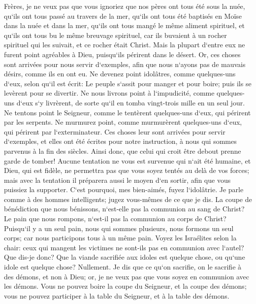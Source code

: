 \verse Frères, je ne veux pas que vous ignoriez que nos pères ont tous été sous la nuée, qu`ils ont tous passé au travers de la mer, 
\verse qu`ils ont tous été baptisés en Moïse dans la nuée et dans la mer, 
\verse qu`ils ont tous mangé le même aliment spirituel, 
\verse et qu`ils ont tous bu le même breuvage spirituel, car ils buvaient à un rocher spirituel qui les suivait, et ce rocher était Christ. 
\verse Mais la plupart d`entre eux ne furent point agréables à Dieu, puisqu`ils périrent dans le désert. 
\verse Or, ces choses sont arrivées pour nous servir d`exemples, afin que nous n`ayons pas de mauvais désirs, comme ils en ont eu. 
\verse Ne devenez point idolâtres, comme quelques-uns d`eux, selon qu`il est écrit: Le peuple s`assit pour manger et pour boire; puis ils se levèrent pour se divertir. 
\verse Ne nous livrons point à l`impudicité, comme quelques-uns d`eux s`y livrèrent, de sorte qu`il en tomba vingt-trois mille en un seul jour. 
\verse Ne tentons point le Seigneur, comme le tentèrent quelques-uns d`eux, qui périrent par les serpents. 
\verse Ne murmurez point, comme murmurèrent quelques-uns d`eux, qui périrent par l`exterminateur. 
\verse Ces choses leur sont arrivées pour servir d`exemples, et elles ont été écrites pour notre instruction, à nous qui sommes parvenus à la fin des siècles. 
\verse Ainsi donc, que celui qui croit être debout prenne garde de tomber! 
\verse Aucune tentation ne vous est survenue qui n`ait été humaine, et Dieu, qui est fidèle, ne permettra pas que vous soyez tentés au delà de vos forces; mais avec la tentation il préparera aussi le moyen d`en sortir, afin que vous puissiez la supporter. 
\verse C`est pourquoi, mes bien-aimés, fuyez l`idolâtrie. 
\verse Je parle comme à des hommes intelligents; jugez vous-mêmes de ce que je dis. 
\verse La coupe de bénédiction que nous bénissons, n`est-elle pas la communion au sang de Christ? Le pain que nous rompons, n`est-il pas la communion au corps de Christ? 
\verse Puisqu`il y a un seul pain, nous qui sommes plusieurs, nous formons un seul corps; car nous participons tous à un même pain. 
\verse Voyez les Israélites selon la chair: ceux qui mangent les victimes ne sont-ils pas en communion avec l`autel? 
\verse Que dis-je donc? Que la viande sacrifiée aux idoles est quelque chose, ou qu`une idole est quelque chose? Nullement. 
\verse Je dis que ce qu`on sacrifie, on le sacrifie à des démons, et non à Dieu; or, je ne veux pas que vous soyez en communion avec les démons. 
\verse Vous ne pouvez boire la coupe du Seigneur, et la coupe des démons; vous ne pouvez participer à la table du Seigneur, et à la table des démons. 
